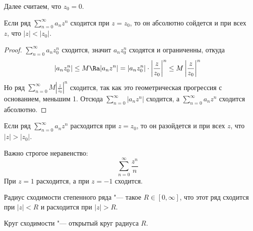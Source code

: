 \begin{Rem}
	Далее считаем, что $z_0 = 0$.
\end{Rem}

\begin{theorem}[Абеля]
	Если ряд $\sum_{n=0}^\infty a_n z^n$ сходится при $z = z_0$, то он абсолютно сойдется и при всех $z$, что $|z| < |z_0|$.
\end{theorem}
\begin{proof}
	$\sum_{n=0}^\infty a_n z_0^n$ сходится, значит $a_n z_0^n$ сходятся и ограниченны, откуда
	\begin{gather*}
		|a_n z_0^n| \le M
		\Ra |a_n z^n| = |a_n z_0^n| \cdot \left| \frac{z}{z_0} \right|^n \le M \left| \frac{z}{z_0} \right|^n
	\end{gather*}
	Но ряд $\sum_{n=0}^\infty M \left| \frac{z}{z_0} \right|^n$ сходится, так как это геометрическая прогрессия с основанием, меньшим 1.
	Отсюда $\sum_{n=0}^\infty |a_n z^n|$ сходится, а $\sum_{n=0}^\infty a_n z^n$ сходится абсолютно.
\end{proof}

\begin{conseq}
	Если ряд $\sum_{n=0}^\infty a_n z^n$ расходится при $z = z_0$, то он разойдется и при всех $z$, что $|z| > |z_0|$.
\end{conseq}

\begin{exmp}
	Важно строгое неравенство:
	\[ \sum_{n=0}^\infty \frac{z^n}n \]
	При $z = 1$ расходится, а при $z = -1$ сходится.
\end{exmp}

\begin{Def}
	Радиус сходимости степенного ряда "--- такое $R \in [0, \infty]$, что этот ряд сходится при $|z| < R$ и расходится при $|z| > R$.
\end{Def}

\begin{Def}
	Круг сходимости "--- открытый круг радиуса $R$.
\end{Def}

